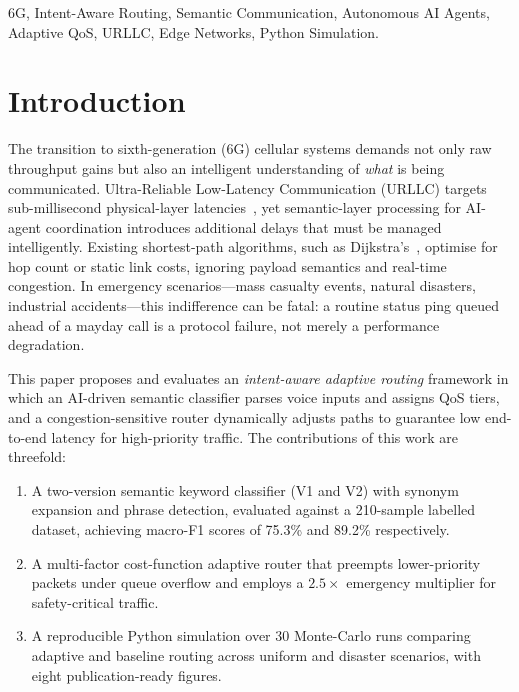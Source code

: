 \documentclass[conference]{IEEEtran}
\begin{document}
\begin{IEEEkeywords}
6G, Intent-Aware Routing, Semantic Communication, Autonomous AI Agents,
Adaptive QoS, URLLC, Edge Networks, Python Simulation.
\end{IEEEkeywords}

\section{Introduction}

The transition to sixth-generation (6G) cellular systems demands not only raw
throughput gains but also an intelligent understanding of \emph{what} is being
communicated.  Ultra-Reliable Low-Latency Communication (URLLC) targets
sub-millisecond physical-layer latencies~\cite{b4}, yet semantic-layer
processing for AI-agent coordination introduces additional delays that must be
managed intelligently.  Existing shortest-path algorithms, such as
Dijkstra's~\cite{b3}, optimise for hop count or static link costs, ignoring
payload semantics and real-time congestion.  In emergency scenarios—mass
casualty events, natural disasters, industrial accidents—this indifference can
be fatal: a routine status ping queued ahead of a mayday call is a protocol
failure, not merely a performance degradation.

This paper proposes and evaluates an \emph{intent-aware adaptive routing}
framework in which an AI-driven semantic classifier parses voice inputs and
assigns QoS tiers, and a congestion-sensitive router dynamically adjusts paths
to guarantee low end-to-end latency for high-priority traffic.  The
contributions of this work are threefold:

\begin{enumerate}
  \item A two-version semantic keyword classifier (V1 and V2) with synonym
        expansion and phrase detection, evaluated against a 210-sample
        labelled dataset, achieving macro-F1 scores of 75.3\% and 89.2\%
        respectively.
  \item A multi-factor cost-function adaptive router that preempts
        lower-priority packets under queue overflow and employs a
        $2.5\times$ emergency multiplier for safety-critical traffic.
  \item A reproducible Python simulation over 30 Monte-Carlo runs comparing
        adaptive and baseline routing across uniform and disaster scenarios,
        with eight publication-ready figures.
\end{enumerate}
\end{document}

